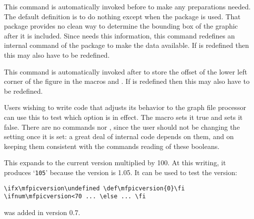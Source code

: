 \documentclass[letterpaper]{article}
\begin{document}
\begin{cd}
%
\end{cd}

This command is automatically invoked before  to
make any preparations needed. The default definition is to do nothing
except when the  package is used. That package provides
no clean way to determine the bounding box of the graphic after it is
included. Since \mfp{} needs this information, this command redefines an
internal command of the  package to make the data
available. If  is redefined then this may also have
to be redefined.

\begin{cd}
%
\end{cd}

This command is automatically invoked after  to
store the offset of the lower left corner of the figure in the macros
 and . If  is redefined
then this may also have to be redefined.

\begin{cd}
%
\end{cd}

Users wishing to write code that adjusts its behavior to the graph file
processor can use this to test which option is in effect. The macro
 sets it true and  sets it false. There
are no commands  nor , since the user
should not be changing the setting once it is set: a great deal of
\mfp{} internal code depends on them, and on keeping them consistent
with the  commands reading of these booleans.

\begin{cd}
%
\end{cd}

This expands to the current \mfp{} version multiplied by 100. At this
writing, it produces `\texttt{105}' because the version is 1.05. It can
be used to test the version:
\begin{verbatim}
\ifx\mfpicversion\undefined \def\mfpicversion{0}\fi
\ifnum\mfpicversion<70 ... \else ... \fi
\end{verbatim}
 was added in version 0.7.
\end{document}
